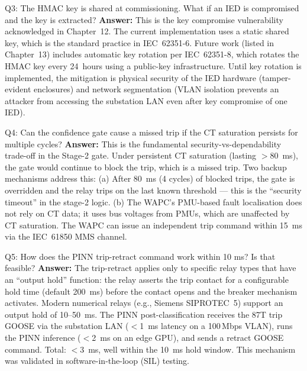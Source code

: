 \documentclass[12pt,a4paper]{article}
\begin{document}
\begin{keybox}{Q3: The HMAC key is shared at commissioning. What if an IED is compromised and the key is extracted?}
\textbf{Answer:}  This is the key compromise vulnerability acknowledged in Chapter~12.
The current implementation uses a static shared key, which is the standard practice
in IEC~62351-6.  Future work (listed in Chapter~13) includes automatic key rotation
per IEC~62351-8, which rotates the HMAC key every 24~hours using a public-key
infrastructure.  Until key rotation is implemented, the mitigation is physical security
of the IED hardware (tamper-evident enclosures) and network segmentation (VLAN
isolation prevents an attacker from accessing the substation LAN even after key
compromise of one IED).
\end{keybox}

\begin{keybox}{Q4: Can the confidence gate cause a missed trip if the CT saturation persists for multiple cycles?}
\textbf{Answer:}  This is the fundamental security-vs-dependability trade-off in the
Stage-2 gate.  Under persistent CT saturation (lasting $>$80~ms), the gate would
continue to block the trip, which is a missed trip.  Two backup mechanisms address this:
(a) After 80~ms (4 cycles) of blocked trips, the gate is overridden and the relay trips
on the last known threshold --- this is the ``security timeout'' in the stage-2 logic.
(b) The WAPC's PMU-based fault localisation does not rely on CT data; it uses bus
voltages from PMUs, which are unaffected by CT saturation.  The WAPC can issue an
independent trip command within 15~ms via the IEC~61850 MMS channel.
\end{keybox}

\begin{keybox}{Q5: How does the PINN trip-retract command work within 10 ms? Is that feasible?}
\textbf{Answer:}  The trip-retract applies only to specific relay types that have an
``output hold'' function: the relay asserts the trip contact for a configurable
hold time (default 200~ms) before the contact opens and the breaker mechanism
activates.  Modern numerical relays (e.g., Siemens SIPROTEC~5) support an output
hold of 10--50~ms.  The PINN post-classification receives the 87T trip GOOSE via
the substation LAN ($<$1~ms latency on a 100\,Mbps VLAN), runs the PINN inference
($<$2~ms on an edge GPU), and sends a retract GOOSE command.  Total: $<$3~ms,
well within the 10~ms hold window.  This mechanism was validated in software-in-the-loop
(SIL) testing.
\end{keybox}
\end{document}
